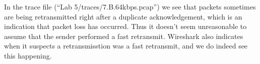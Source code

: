 In the trace file (``Lab 5/traces/7.B.64kbps.pcap'') we see that packets sometimes are being retransmitted right after a duplicate acknowledgement, which is an indication that packet loss has occurred. Thus it doesn't seem unreasonable to assume that the sender performed a fast retransmit. Wireshark also indicates when it suspects a retransmisstion was a fast retransmit, and we do indeed see this happening.